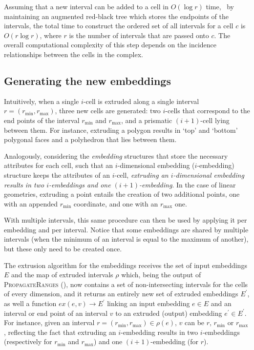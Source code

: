 Assuming that a new interval can be added to a cell in $O(\log r)$ time, \eg\ by maintaining an augmented red-black tree which stores the endpoints of the intervals, the total time to construct the ordered set of all intervals for a cell $c$ is $O(r \log r)$, where $r$ is the number of intervals that are passed onto $c$.
The overall computational complexity of this step depends on the incidence relationships between the cells in the complex.

\subsection{Generating the new embeddings}
\label{ss:embeddings}

Intuitively, when a single $i$-cell is extruded along a single interval $r = (r_{\min}, r_{\max})$, three new cells are generated: two $i$-cells that correspond to the end points of the interval $r_{\min}$ and $r_{\max}$, and a prismatic $(i+1)$-cell lying between them.
For instance, extruding a polygon results in `top' and `bottom' polygonal faces and a polyhedron that lies between them.

Analogously, considering the \emph{embedding} structures that store the necessary attributes for each cell, such that an $i$-dimensional embedding ($i$-embedding) structure keeps the attributes of an $i$-cell, \emph{extruding an $i$-dimensional embedding results in two $i$-embeddings and one $(i+1)$-embedding}.
In the case of linear geometries, extruding a point entails the creation of two additional points, one with an appended $r_{\min}$ coordinate, and one with an $r_{\max}$ one.

With multiple intervals, this same procedure can then be used by applying it per embedding and per interval.
Notice that some embeddings are shared by multiple intervals (when the minimum of an interval is equal to the maximum of another), but these only need to be created once.

The extrusion algorithm for the embeddings receives the set of input embeddings $E$ and the map of extruded intervals $\rho$ which, being the output of \textsc{PropagateRanges} (), now contains a set of non-intersecting intervals for the cells of every dimension, and it returns an entirely new set of extruded embeddings $E^{\prime}$, as well a function $ex(e, v) \rightarrow E^\prime$ linking an input embedding $e \in E$ and an interval or end point of an interval $v$ to an extruded (output) embedding $e^{\prime} \in E^{\prime}$.
For instance, given an interval $r = (r_{\min}, r_{\max}) \in \rho(e)$, $v$ can be $r$, $r_{\min}$ or $r_{\max}$, reflecting the fact that extruding an $i$-embedding results in two $i$-embeddings (respectively for $r_{\min}$ and $r_{\max}$) and one $(i+1)$-embedding (for $r$).

